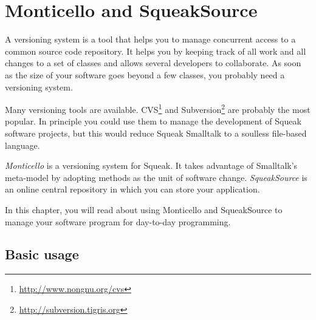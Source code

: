 \documentclass[a4paper,10pt,twoside]{book}
\begin{document}
	\sloppy
\fi

\newcommand{\figlabel}[1]{\label{fig:#1}}
\newcommand{\seclabel}[1]{\label{sec:#1}}

\chapter{Monticello and SqueakSource}


A versioning system is a tool that helps you to manage concurrent access to a common source code repository. It helps you by keeping track of all work and all changes to a set of classes and allows several developers to collaborate. As soon as the size of your software goes beyond a few classes, you probably need a versioning system.

Many versioning tools are available. CVS\footnote{\url{http://www.nongnu.org/cvs}} and Subversion\footnote{\url{http://subversion.tigris.org}} are probably the most popular.
In principle you could use them to manage the development of Squeak software projects, but this would reduce Squeak Smalltalk to a soulless file-based language. 

\emph{Monticello} is a versioning system for Squeak. It takes advantage of Smalltalk's meta-model by adopting methods as the unit of software change. \emph{SqueakSource} is an online central repository in which you can store your application.

In this chapter, you will read about using Monticello and SqueakSource to manage your software program for day-to-day programming.


\section{Basic usage}
\end{document}
